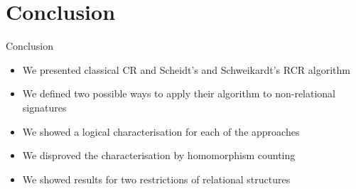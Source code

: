 \documentclass[aspectratio=169]{beamer}
\begin{document}
	
	\section{Conclusion}
	
	\begin{frame}{Conclusion}
		\begin{itemize}
			\item We presented classical CR and Scheidt's and Schweikardt's RCR algorithm
			\item We defined two possible ways to apply their algorithm to non-relational signatures
			\item We showed a logical characterisation for each of the approaches
			\item We disproved the characterisation by homomorphism counting
			\item We showed results for two restrictions of relational structures
		\end{itemize}
	\end{frame}
	
\end{document}
